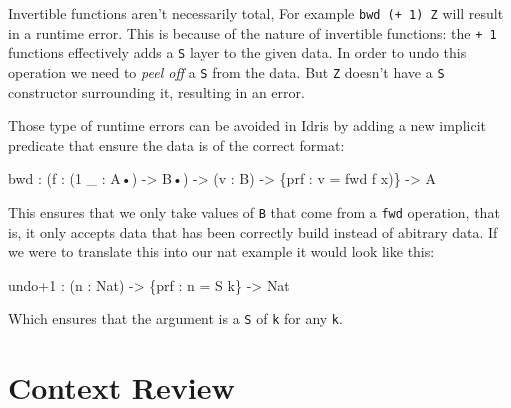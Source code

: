 \documentclass[
]{article}
\newenvironment{Shaded}{}{}
\newcommand{\DataTypeTok}[1]{\textcolor[rgb]{0.56,0.13,0.00}{#1}}
\newcommand{\DecValTok}[1]{\textcolor[rgb]{0.25,0.63,0.44}{#1}}
\newcommand{\NormalTok}[1]{#1}
\newcommand{\OperatorTok}[1]{\textcolor[rgb]{0.40,0.40,0.40}{#1}}
\newcommand{\OtherTok}[1]{\textcolor[rgb]{0.00,0.44,0.13}{#1}}
\begin{document}
Invertible functions aren't necessarily total, For example
\texttt{bwd\ (+\ 1)\ Z} will result in a runtime error. This is because
of the nature of invertible functions: the \texttt{+\ 1} functions
effectively adds a \texttt{S} layer to the given data. In order to undo
this operation we need to \emph{peel off} a \texttt{S} from the data.
But \texttt{Z} doesn't have a \texttt{S} constructor surrounding it,
resulting in an error.

Those type of runtime errors can be avoided in Idris by adding a new
implicit predicate that ensure the data is of the correct format:

\begin{Shaded}
\begin{Highlighting}[]
\NormalTok{bwd }\OperatorTok{:}\NormalTok{ (f }\OperatorTok{:}\NormalTok{ (}\DecValTok{1}\NormalTok{ \_ }\OperatorTok{:} \DataTypeTok{A}\NormalTok{•) }\OtherTok{{-}\textgreater{}} \DataTypeTok{B}\NormalTok{•) }\OtherTok{{-}\textgreater{}}\NormalTok{ (v }\OperatorTok{:} \DataTypeTok{B}\NormalTok{) }\OtherTok{{-}\textgreater{}}\NormalTok{ \{prf }\OperatorTok{:}\NormalTok{ v }\OtherTok{=}\NormalTok{ fwd f x)\} }\OtherTok{{-}\textgreater{}} \DataTypeTok{A}
\end{Highlighting}
\end{Shaded}

This ensures that we only take values of \texttt{B} that come from a
\texttt{fwd} operation, that is, it only accepts data that has been
correctly build instead of abitrary data. If we were to translate this
into our nat example it would look like this:

\begin{Shaded}
\begin{Highlighting}[]
\NormalTok{undo}\OperatorTok{+}\DecValTok{1} \OperatorTok{:}\NormalTok{ (n }\OperatorTok{:} \DataTypeTok{Nat}\NormalTok{) }\OtherTok{{-}\textgreater{}}\NormalTok{ \{prf }\OperatorTok{:}\NormalTok{ n }\OtherTok{=} \DataTypeTok{S}\NormalTok{ k\} }\OtherTok{{-}\textgreater{}} \DataTypeTok{Nat}
\end{Highlighting}
\end{Shaded}

Which ensures that the argument is a \texttt{S} of \texttt{k} for any
\texttt{k}.

\hypertarget{context-review}{%
\section{Context Review}\label{context-review}}
\end{document}
